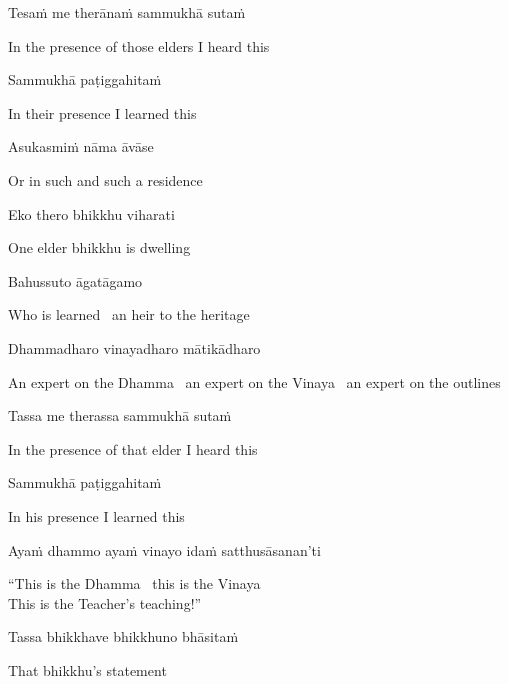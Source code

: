 Tesaṁ me therānaṁ sammukhā sutaṁ

\begin{english}
  In the presence of those elders I heard this
\end{english}

Sammukhā paṭiggahitaṁ

\begin{english}
  In their presence I learned this
\end{english}

Asukasmiṁ nāma āvāse

\begin{english}
  Or in such and such a residence
\end{english}

Eko thero bhikkhu viharati

\begin{english}
  One elder bhikkhu is dwelling
\end{english}

Bahussuto āgatāgamo

\begin{english}
  Who is learned \breathmark\ an heir to the heritage
\end{english}

Dhammadharo vinayadharo mātikādharo

\begin{english-hang}
  An expert on the Dhamma \breathmark\ an expert on the Vinaya \breathmark\ an expert on the outlines
\end{english-hang}

Tassa me therassa sammukhā sutaṁ

\begin{english}
  In the presence of that elder I heard this
\end{english}

Sammukhā paṭiggahitaṁ

\begin{english}
  In his presence I learned this
\end{english}

Ayaṁ dhammo ayaṁ vinayo idaṁ satthusāsanan'ti

\begin{english}
  ``This is the Dhamma \breathmark\ this is the Vinaya\\
  This is the Teacher's teaching!''
\end{english}

Tassa bhikkhave bhikkhuno bhāsitaṁ

\begin{english}
  That bhikkhu's statement
\end{english}

